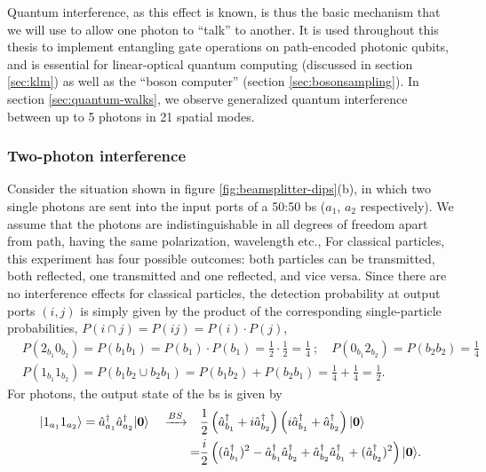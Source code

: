 Quantum interference, as this effect is known, is thus the basic mechanism that we will use to allow one photon to ``talk'' to another.
It is used throughout this thesis to implement entangling gate operations on path-encoded photonic qubits, and is essential for linear-optical quantum computing (discussed in section \ref{sec:klm}) as well as the ``boson computer'' (section \ref{sec:bosonsampling}). In section \ref{sec:quantum-walks}, we observe generalized quantum interference between up to 5 photons in 21 spatial modes.

\subsubsection{Two-photon interference}
\label{sec:hong-ou-mandel}
Consider the situation shown in figure \ref{fig:beamsplitter-dips}(b), in which two single photons are sent into the input ports of a 50:50 \gls{bs} ($a_1$, $a_2$ respectively). 
We assume that the photons are indistinguishable in all degrees of freedom apart from path, having the same polarization, wavelength etc., For classical particles, this experiment has four possible outcomes: both particles can be transmitted, both reflected, one transmitted and one reflected, and vice versa. Since there are no interference effects for classical particles, the detection probability at output ports $(i,j)$ is simply given by the product of the corresponding single-particle probabilities, $P(i \cap j) = P(ij) = P(i) \cdot P(j)$,
\begin{align}
    & P(2_{b_1}0_{b_2}) = P(b_1 b_1) = P(b_1)\cdot P(b_1) = \frac{1}{2} \cdot \frac{1}{2} = \frac{1}{4}~; \quad
    P(0_{b_1}2_{b_2}) = P(b_2 b_2) =  \frac{1}{4}\\
    &P(1_{b_1}1_{b_2}) = P(b_1 b_2 \cup b_2 b_1) = P(b_1 b_2)+P(b_2 b_1) = \frac{1}{4}+\frac{1}{4} = \frac{1}{2}.
     \label{eqn:classical-particles-no-dip}
\end{align}
For photons, the output state of the \gls{bs} is given by
\begin{align}
    \mbox{$ | 1_{a_1}1_{a_2} \rangle $} = \hat{a}^{\dagger}_{a_1} \hat{a}^{\dagger}_{a_2} \mbox{$ | \mathbf{0} \rangle $} 
    \quad \xrightarrow{BS} \quad
    &\frac{1}{2} 
    \left( \hat{a}^{\dagger}_{b_1} +i  \hat{a}^{\dagger}_{b_2} \right)
    \left( i\hat{a}^{\dagger}_{b_1} +  \hat{a}^{\dagger}_{b_2} \right) \mbox{$ | \mathbf{0} \rangle $}\\
    =
    &\frac{i}{2} 
    \left(   (\hat{a}^{\dagger}_{b_1})^2 -  \hat{a}^{\dagger}_{b_1} \hat{a}^{\dagger}_{b_2} +\hat{a}^{\dagger}_{b_2} \hat{a}^{\dagger}_{b_1} + (\hat{a}^{\dagger}_{b_2})^2 \right)
    \mbox{$ | \mathbf{0} \rangle $}.
\end{align}
